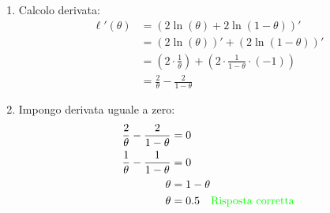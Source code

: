 \documentclass{article}  %
\theoremstyle{definition}
\begin{document}
\begin{esempio}
\begin{enumerate}
\begin{align*}
			                                              & = 2\ln(\theta)+2\ln(1-\theta)
		      \end{align*}
		\item Calcolo derivata:
		      \begin{align*}
			      \ell'(\theta) & = (2\ln(\theta)+2\ln(1-\theta))'                                      \\
			                    & = (2\ln(\theta))'+(2\ln(1-\theta))'                                   \\
			                    & = (2 \cdot \frac{1}{\theta}) + (2 \cdot \frac{1}{1-\theta}\cdot (-1)) \\
			                    & = \frac{2}{\theta} - \frac{2}{1- \theta}
		      \end{align*}
		\item Impongo derivata uguale a zero:
		      \begin{align*}
			      \frac{2}{\theta} - \frac{2}{1- \theta} & = 0                                                     \\
			      \frac{1}{\theta} - \frac{1}{1- \theta} & = 0                                                     \\
			      \theta                                 & = 1-\theta                                              \\
			      \theta                                 & = 0.5 \quad \textcolor{green}{\text{Risposta corretta}}
		      \end{align*}
	\end{enumerate}
\end{esempio}
\end{document}
